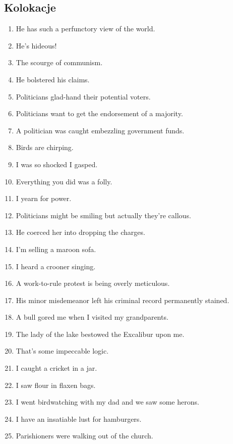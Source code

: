 \documentclass[a4paper]{article}
\begin{document}
\subsection{Kolokacje}
\begin{enumerate}
    \item He has such a perfunctory view of the world.
    \item He's hideous!
    \item The scourge of communism.
    \item He bolstered his claims.
    \item Politicians glad-hand their potential voters.
    \item Politicians want to get the endorsement of a majority.
    \item A politician was caught embezzling government funds.
    \item Birds are chirping.
    \item I was so shocked I gasped.
    \item Everything you did was a folly.
    \item I yearn for power.
    \item Politicians might be smiling but actually they're callous.
    \item He coerced her into dropping the charges.
    \item I'm selling a maroon sofa.
    \item I heard a crooner singing.
    \item A work-to-rule protest is being overly meticulous.
    \item His minor misdemeanor left his criminal record permanently stained.
    \item A bull gored me when I visited my grandparents.
    \item The lady of the lake bestowed the Excalibur upon me.
    \item That's some impeccable logic.
    \item I caught a cricket in a jar.
    \item I saw flour in flaxen bags.
    \item I went birdwatching with my dad and we saw some herons.
    \item I have an insatiable lust for hamburgers.
    \item Parishioners were walking out of the church.
\end{enumerate}
\end{document}
